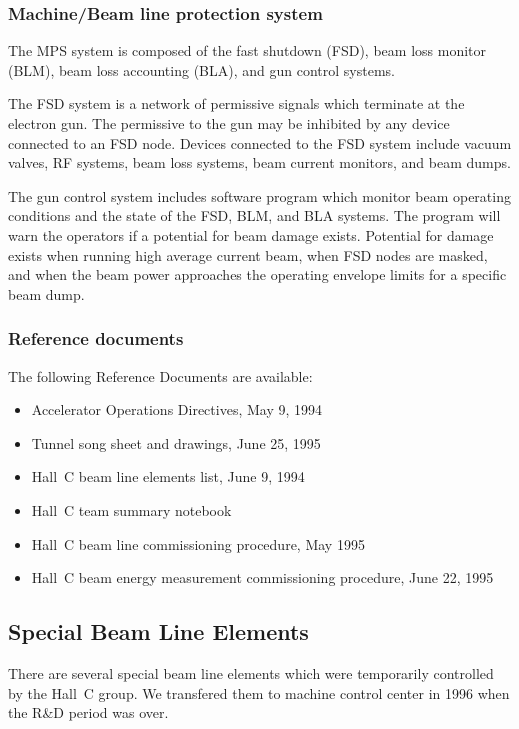 \subsubsection{Machine/Beam line protection system}

The MPS system is composed of the fast shutdown (FSD), beam loss
monitor (BLM), beam loss accounting (BLA), and gun control systems.

The FSD system is a network of permissive signals which terminate
at the electron gun. The permissive to the gun may be inhibited by any 
device connected to an FSD node.
Devices connected to the FSD system include vacuum valves, RF
systems, beam loss systems, beam current monitors, and beam dumps.

The gun control system includes software program which monitor
beam operating conditions and the state of the FSD, BLM, and BLA systems.
The program will warn the operators if a potential for beam damage
exists. Potential for damage exists when running high average current
beam, when FSD nodes are masked, and when the beam power approaches
the operating envelope limits for a specific beam dump.

\subsubsection{Reference documents}

The following Reference Documents are available:

\begin{itemize}
\item{Accelerator Operations Directives, May 9, 1994}
\item{Tunnel song sheet and drawings, June 25, 1995}
\item{Hall~C beam line elements list, June 9, 1994}
\item{Hall~C team summary notebook}
\item{Hall~C beam line commissioning procedure, May 1995}
\item{Hall~C beam energy measurement commissioning procedure, June 22, 1995}
\end{itemize}

\subsection{Special Beam Line Elements}

There are several special beam line elements which were temporarily
controlled by the Hall~C group. We transfered them to machine
control center in 1996 when the R\&D period was over.

